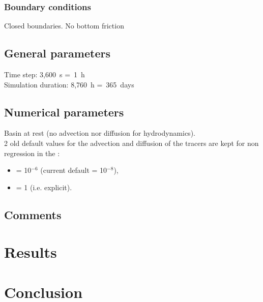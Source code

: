 \subsubsection{Boundary conditions}
%
Closed boundaries. No bottom friction
%
\subsection{General parameters}
%
Time step: 3,600~s =~1~h\\
Simulation duration: 8,760~h =~365~days
%
%
%
\subsection{Numerical parameters}
%
Basin at rest (no advection nor diffusion for hydrodynamics).\\
%
2 old default values for the advection and diffusion of the tracers are kept for non regression
in the   :
\begin{itemize}
\item {} = 10$^{-6}$ (current default = 10$^{-8}$),
\item {} = 1 (i.e. explicit).
\end{itemize}
%
\subsection{Comments}
%
%
%
\section{Results}
%

%
\section{Conclusion}
%

%
%
